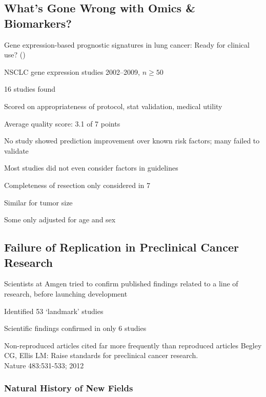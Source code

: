 \subsection{What's Gone Wrong with Omics \& Biomarkers?}
\bi
\item Gene expression-based
prognostic signatures in lung cancer: Ready for clinical use? (\citet{sub10gen})
\item NSCLC gene expression studies 2002--2009, $n \geq 50$
\item 16 studies found
\item Scored on appropriateness of protocol, stat validation, medical
utility
\item Average quality score: 3.1 of 7 points
\item No study showed prediction improvement over known risk factors;
  many failed to validate
\item Most studies did not even consider factors in guidelines
 \bi
 \item Completeness of resection only considered in 7
 \item Similar for tumor size
 \item Some only adjusted for age and sex
 \ei
\ei

\subsection{Failure of Replication in Preclinical Cancer Research}
\bi
\item Scientists at Amgen tried to confirm published findings related
  to a line of research, before launching development
\item Identified 53 `landmark' studies
\item Scientific findings confirmed in only 6 studies
\item Non-reproduced articles cited far more frequently than
  reproduced articles
\ei
Begley CG, Ellis LM: Raise standards for preclinical cancer
  research.\\Nature 483:531-533; 2012

\subsubsection{Natural History of New Fields}

